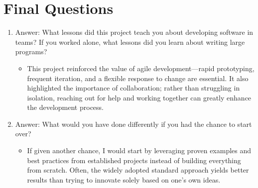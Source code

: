 \documentclass{article}
\begin{document}
\section{Final Questions}
\begin{enumerate}
    \item  Answer: What lessons did this project teach you about developing software in teams? If you worked alone, what lessons did you learn about writing large programs?
    \begin{itemize}
        \item This project reinforced the value of agile development—rapid prototyping, frequent iteration, and a flexible response to change are essential. It also highlighted the importance of collaboration; rather than struggling in isolation, reaching out for help and working together can greatly enhance the development process.
    \end{itemize}
    \item Answer: What would you have done differently if you had the chance to start over?
    \begin{itemize}
        \item If given another chance, I would start by leveraging proven examples and best practices from established projects instead of building everything from scratch. Often, the widely adopted standard approach yields better results than trying to innovate solely based on one's own ideas.
    \end{itemize}
\end{enumerate}
\end{document}
